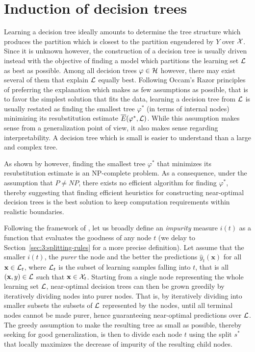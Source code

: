 \section{Induction of decision trees}
\label{sec:3:induction}

Learning a decision tree ideally amounts to determine the tree structure which
produces the partition which is closest to the partition engendered by $Y$ over
${\cal X}$. Since it is unknown however, the construction of a decision tree is usually
driven instead with the objective of finding a model which partitions the
learning set ${\cal L}$ as best as possible. Among all decision trees $\varphi
\in {\cal H}$ however, there may exist several of them that explain ${\cal L}$
equally best. Following Occam's Razor principles~\citep{blumer:1987} of preferring the explanation
which makes as few assumptions as possible, that is to favor the simplest
solution that fits the data, learning a decision tree from ${\cal L}$ is
usually restated as finding the smallest tree $\varphi^*$ (in terms of internal nodes) minimizing its
resubstitution estimate $\overline{E}(\varphi^*, {\cal L})$. While this
assumption makes sense from a generalization point of view, it also makes
sense regarding interpretability. A decision tree which is small is easier
to understand than a large and complex tree.

As shown by \citet{hyafil:1976} however, finding the smallest tree $\varphi^*$
that minimizes its resubstitution estimate is an NP-complete problem. As a
consequence, under the assumption that $P \neq NP$, there exists no efficient
algorithm for finding $\varphi^*$, thereby suggesting that finding efficient heuristics
for constructing near-optimal decision trees is the best solution to keep computation
requirements within realistic boundaries.

Following the framework of \citet{breiman:1984}, let us broadly define an
\textit{impurity} measure $i(t)$ as a function that evaluates the goodness of
any node $t$ (we delay to Section~\ref{sec:3:splitting-rules} for a more
precise definition). Let assume that the smaller $i(t)$, the \textit{purer} the
node and the better the predictions $\widehat{y}_t(\mathbf{x})$ for all
$\mathbf{x} \in {\cal L}_t$, where ${\cal L}_t$ is the subset of learning
samples falling into $t$, that is all $(\mathbf{x}, y) \in {\cal L}$ such that
$\mathbf{x} \in {\cal X}_t$.
Starting from a single node representing the whole learning set  ${\cal L}$,
near-optimal decision trees can then be grown greedily by iteratively dividing
nodes into purer nodes. That is, by iteratively  dividing into smaller subsets the
subsets of ${\cal L}$ represented by the nodes, until all terminal nodes cannot
be made purer, hence guaranteeing near-optimal predictions over ${\cal L}$. The
greedy assumption to make the resulting tree as small as possible, thereby
seeking for good generalization, is then to divide each node $t$ using the
split $s^*$ that locally maximizes the decrease of impurity of the resulting child nodes.

